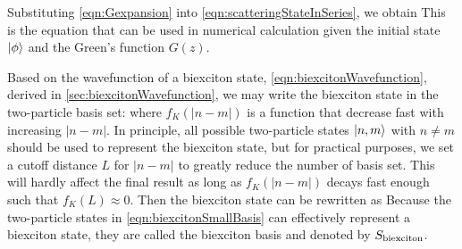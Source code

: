 Substituting \autoref{eqn:Gexpansion} into \autoref{eqn:scatteringStateInSeries}, we obtain
This is the equation that can be used in numerical calculation given the initial state $| \phi \rangle$ and the Green's 
function $G(z)$. 

Based on the wavefunction of a biexciton state, \autoref{eqn:biexcitonWavefunction}, derived in 
\autoref{sec:biexcitonWavefunction}, we may write the biexciton state in the two-particle basis set:
where $f_{K}(|n-m|)$ is a function that decrease fast with increasing $|n-m|$. 
In principle, all possible two-particle states $| n, m \rangle$ with $n \neq m$ should be 
used to represent the biexciton state, but for practical purposes, we set
a cutoff distance $L$ for $|n-m|$ to greatly reduce the number of basis set. This will hardly affect the final result
as long as  $f_{K}(|n-m|)$ decays fast enough such that $f_{K}(L) \approx 0$. Then the biexciton state can be
rewritten as
Because the two-particle states in \autoref{eqn:biexcitonSmallBasis} can effectively represent a biexciton state, they 
are called the biexciton basis and denoted by $S_{\rm biexciton}$. 

